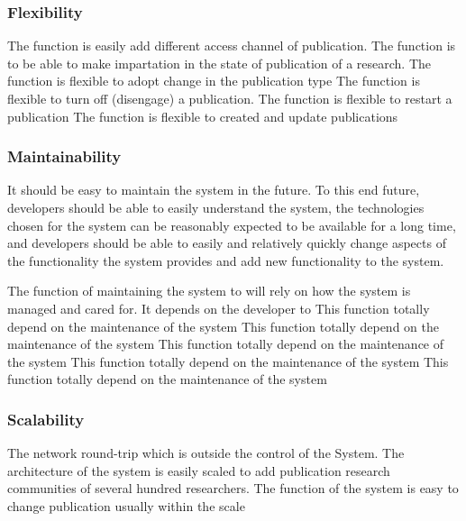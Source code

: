 \subsubsection{Flexibility}
 The function is easily add different access channel of publication.
 The function is to be able to make impartation in the state of publication of a research.
 The function is flexible to adopt change in the publication type 
 The function is flexible to turn off (disengage) a publication.
 The function is flexible to restart a publication
 The function is flexible to created and update publications

\subsubsection{Maintainability}
It should be easy to maintain the system in the future. To this end future, developers should be able to easily understand the system, the technologies chosen for the system can be reasonably expected to be available for a long time, and developers should be able to easily and relatively quickly change aspects of the functionality the system provides and add new functionality to the system.

 The function of maintaining the system to will rely on how the system is managed and cared for.  It depends on the developer to
 This function totally depend on the maintenance of the system 
 This function totally depend on the maintenance of the system
 This function totally depend on the maintenance of the system
 This function totally depend on the maintenance of the system
 This function totally depend on the maintenance of the system

\subsubsection{Scalability} The network round-trip which is outside the control of the System.
 The architecture of the system is easily scaled to add publication research communities of several hundred researchers. 
 The function of the system is easy to change publication usually within the scale

